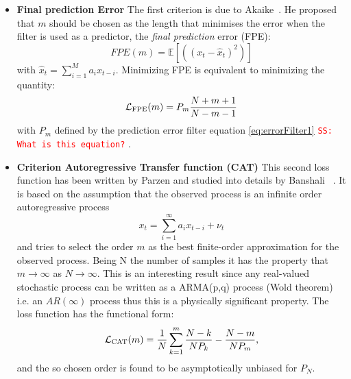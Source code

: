\documentclass[twocolumn,showpacs,preprintnumbers,nofootinbib,prd,
superscriptaddress,10pt]{revtex4-1}
\newcommand{\sschmidt}[1]{{\textcolor{red}{\texttt{SS: #1}} }}
\begin{document}
\begin{itemize}
\item \textbf{Final prediction Error } 
The first criterion is due to Akaike~\cite{Akaike1970StatisticalPI}. He proposed that $m$ should be chosen as the 
length that minimises the error when the filter is used as a predictor, the \emph{final prediction} error (FPE): 
\begin{equation}
    FPE(m) = \mathbb{E}\left[ \left((x_t - \hat x_t) ^ 2\right) \right]
\end{equation}
with $\hat{x}_t = \sum_{i = 1}^M a_i x_{t - i}$.
Minimizing FPE is equivalent to minimizing the quantity: 
\begin{equation}
    \mathcal{L}_{\rm FPE}(m) = P_{m} \frac{N + m + 1}{N - m - 1}
\end{equation}
with $P_m$ defined by the prediction error filter equation \ref{eq:errorFilter1} \sschmidt{What is this equation?}.
\item \textbf{Criterion Autoregressive Transfer function (CAT)}
This second loss function has been written by Parzen and studied into details by Banshali ~\cite{bhansali1986}. 
It is based on the assumption that the observed process is an infinite order autoregressive process 
\begin{equation} 
x_t = \sum_{i = 1}^{\infty}a_{i}x_{t-i} + \nu_t
\end{equation} 
and tries to select the order $m$ as the best finite-order approximation for the observed process. Being N the number of samples it has the property that $m \to \infty$ as $N \to \infty$. This is an interesting result since any real-valued
stochastic process can be written as a ARMA(p,q) process (Wold theorem) i.e. an $AR(\infty)$ process thus this is a physically significant property. 
The loss function has the functional form: 
\begin{equation}
    \mathcal{L}_{\rm CAT}(m) = \frac{1}{N}\sum_{k = 1}^m \frac{N - k}{N P_k} - \frac{N - m}{N P_m},
\end{equation}
and the so chosen order is found to be asymptotically unbiased for $P_N$. 


\end{itemize}
\end{document}
